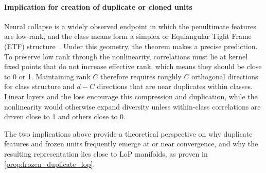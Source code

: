\documentclass{article}
\numberwithin{figure}{section}
\begin{document}
\vspace{-7pt}
\paragraph{Implication for creation of duplicate or cloned units}
Neural collapse is a widely observed endpoint in which the penultimate features are low-rank, and the class means form a simplex or Equiangular Tight Frame (ETF) structure~\citep{papyan2020prevalence}. Under this geometry, the theorem makes a precise prediction. To preserve low rank through the nonlinearity, correlations must lie at kernel fixed points that do not increase effective rank, which means they should be close to 0 or 1. Maintaining rank $C$ therefore requires roughly $C$ orthogonal directions for class structure and $d-C$ directions that are near duplicates within classes. Linear layers and the loss encourage this compression and duplication, while the nonlinearity would otherwise expand diversity unless within-class correlations are driven close to 1 and others close to 0. 

The two implications above provide a theoretical perspective on why duplicate features and frozen units frequently emerge at or near convergence, and why the resulting representation lies close to LoP manifolds, as proven in \cref{prop:frozen_duplicate_lop}.



\end{document}

